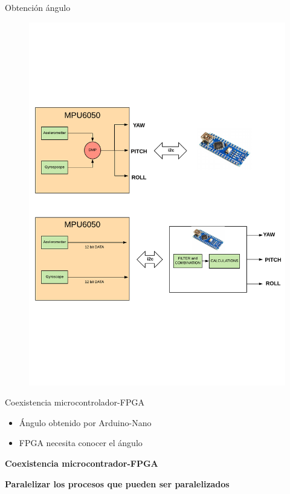 \documentclass{beamer}
\begin{document}
\begin{frame}{Obtención ángulo}
	\begin{figure}[H]
		\center
		\includegraphics[trim = 0mm 5cm 0mm 5cm, clip,scale=0.4]{imagenes/Balancing_robot/DMPexample.pdf}
	\end{figure} 
\end{frame}


\begin{frame}{Coexistencia microcontrolador-FPGA}
\begin{block}{}
	\begin{itemize}
		\item Ángulo obtenido por Arduino-Nano \pause
		\item FPGA necesita conocer el ángulo \pause
	\end{itemize}
\end{block}
\begin{alertblock}{}
	\centering \textbf{Coexistencia microcontrador-FPGA}  \pause
\end{alertblock}
\begin{alertblock}{}
	\centering \textbf{Paralelizar los procesos que pueden ser paralelizados} 
\end{alertblock}
\end{frame}
\end{document}
